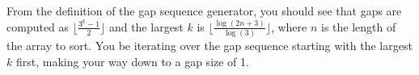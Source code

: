 From the definition of the gap sequence generator, you should see that
gaps are computed as $\lfloor \frac{3^k - 1}{2} \rfloor$ and the largest
$k$ is $\lfloor \frac{\log(2n + 3)}{\log(3)} \rfloor$, where $n$ is the
length of the array to sort. You be iterating over the gap sequence
starting with the largest $k$ first, making your way down to a gap size
of 1.
